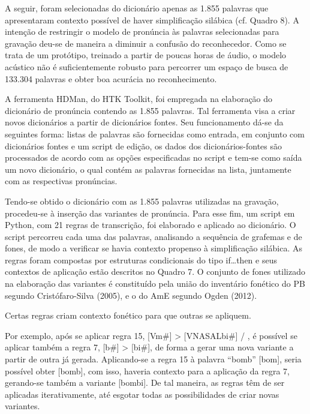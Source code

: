A seguir, foram selecionadas do dicion\'ario apenas as 1.855 palavras que
apresentaram contexto poss\'ivel de haver simplifica\c{c}\~ao sil\'abica (cf.
Quadro 8). A inten\c{c}\~ao de restringir o modelo de pron\'uncia às palavras
selecionadas para grava\c{c}\~ao deu-se de maneira a diminuir a confus\~ao do
reconhecedor. Como se trata de um prot\'otipo, treinado a partir de poucas
horas de \'audio, o modelo ac\'ustico n\~ao \'e suficientemente robusto para
percorrer um espa\c{c}o de busca de 133.304 palavras e obter boa acur\'acia no
reconhecimento.

A ferramenta HDMan, do HTK Toolkit, foi empregada na elabora\c{c}\~ao do
dicion\'ario de pron\'uncia contendo as 1.855 palavras. Tal ferramenta visa
a criar novos dicion\'arios a partir de dicion\'arios fontes. Seu
funcionamento d\'a-se da seguintes forma: listas de palavras s\~ao
fornecidas como entrada, em conjunto com dicion\'arios fontes e um script
de edi\c{c}\~ao, os dados dos dicion\'arios-fontes s\~ao processados de acordo com
as op\c{c}\~oes especificadas no script e tem-se como sa\'ida um novo
dicion\'ario, o qual cont\'em as palavras fornecidas na lista, juntamente
com as respectivas pron\'uncias.

Tendo-se obtido o dicion\'ario com as 1.855 palavras utilizadas na
grava\c{c}\~ao, procedeu-se à inser\c{c}\~ao das variantes de pron\'uncia. Para esse
fim, um script em Python, com 21 regras de transcri\c{c}\~ao, foi elaborado e
aplicado ao dicion\'ario. O script percorreu cada uma das palavras,
analisando a sequ\^encia de grafemas e de fones, de modo a verificar se
havia contexto propenso à simplifica\c{c}\~ao sil\'abica. As regras foram
compostas por estruturas condicionais do tipo if\ldots{}then e seus
contextos de aplica\c{c}\~ao est\~ao descritos no Quadro 7. O conjunto de fones
utilizado na elabora\c{c}\~ao das variantes \'e constitu\'ido pela uni\~ao do
invent\'ario fon\'etico do PB segundo Crist\'ofaro-Silva (2005), e o do AmE
segundo Ogden (2012).

 Certas regras criam contexto fon\'etico para que outras se apliquem.

Por exemplo, ap\'os se aplicar regra 15, {[}Vm\#{]} \textgreater{}
{[}VNASALbi\#{]} / , \'e poss\'ivel se aplicar tamb\'em a regra 7, {[}b\#{]}
\textgreater{} {[}bi\#{]}, de forma a gerar uma nova variante a partir
de outra j\'a gerada. Aplicando-se a regra 15 à palavra ``bomb''
{[}bom{]}, seria poss\'ivel obter {[}bomb{]}, com isso, haveria contexto
para a aplica\c{c}\~ao da regra 7, gerando-se tamb\'em a variante {[}bombi{]}.
De tal maneira, as regras t\^em de ser aplicadas iterativamente, at\'e
esgotar todas as possibilidades de criar novas variantes.

